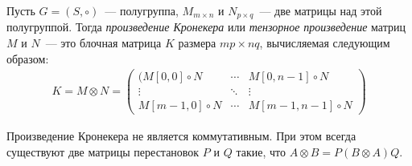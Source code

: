 \begin{definition}
    Пусть $G = (S, \circ)$~--- полугруппа, $M_{m \times n}$ и $N_{p \times q}$~--- две матрицы над этой полугруппой.
    Тогда \emph{произведение Кронекера} или \emph{тензорное произведение} матриц $M$ и $N$~--- это блочная матрица $K$ размера $mp \times nq$, вычисляемая следующим образом:
    \begin{multline*}
        K = M \otimes N =
        \begin{pmatrix}
            (M[0,0] \circ N  & \cdots & M[0,n-1] \circ N   \\
            \vdots           & \ddots & \vdots             \\
            M[m-1,0] \circ N & \cdots & M[m-1,n-1] \circ N
        \end{pmatrix}
    \end{multline*}
\end{definition}

\begin{remark}
    \label{note:KronIsNotCommutative}
    Произведение Кронекера не является коммутативным.
    При этом всегда существуют две матрицы перестановок $P$ и $Q$ такие, что $A \otimes B = P(B \otimes A)Q$.
\end{remark}

\begingroup
\newcommand{\examplemtrx}
{
    \begin{pmatrix}
        5  & 6  & 7  & 8  \\
        9  & 10 & 11 & 12 \\
        13 & 14 & 15 & 16
    \end{pmatrix}
}

